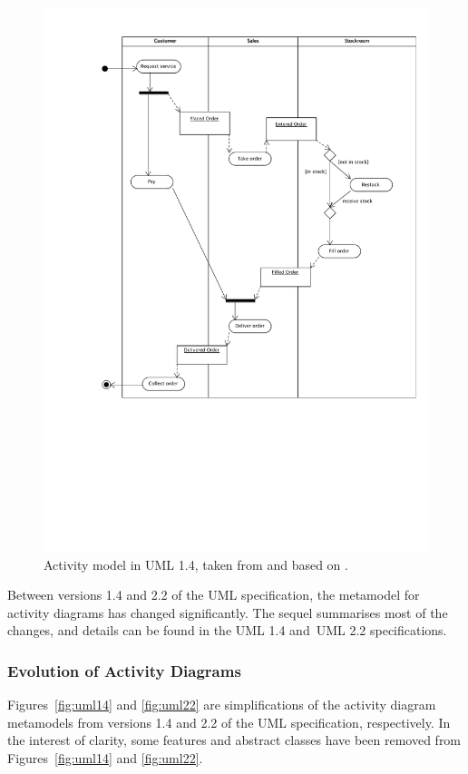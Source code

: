 \begin{figure}[htbp]
  \centering
  \includegraphics*[viewport=75 230 585 800,width=13cm]{6.Evaluation/images/activity.pdf}
  \caption[Activity model in UML 1.4.]{Activity model in UML 1.4, taken from \cite{rose10ttc_case} and based on \cite[pg3-165]{uml14}.}
  \label{fig:activity}
\end{figure}

Between versions 1.4 and 2.2 of the UML specification, the metamodel for activity diagrams has changed significantly. The \cc sequel summarises most of the changes, and details can be found in the UML 1.4 \cite{uml14} and UML 2.2 \cite{uml22} specifications.

\subsubsection{Evolution of Activity Diagrams}
Figures~\ref{fig:uml14} and \ref{fig:uml22} are simplifications of the activity diagram metamodels from versions 1.4 and 2.2 of the UML specification, respectively. In the interest of clarity, some features and abstract classes have been removed from Figures~\ref{fig:uml14} and \ref{fig:uml22}.

